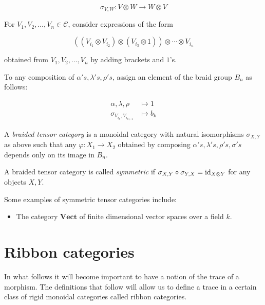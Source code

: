 \begin{equation}
    \sigma_{V,W} : V \otimes W \to W \otimes V
\end{equation}

For $V_1, V_2, \dots, V_n \in \mathcal{C}$, consider expressions of the form 

\begin{equation}
    ((V_{i_1}\otimes V_{i_2}) \otimes (V_{i_3} \otimes 1)) \otimes \cdots \otimes V_{i_n}
\end{equation}

obtained from $V_1,V_2,\ldots,V_n$ by adding brackets and $1$'s.

To any composition of $\alpha's, \lambda's, \rho's$, assign an element of the
braid group $B_n$ as follows:

\begin{align}
    \alpha, \lambda, \rho &\mapsto 1 \\
    \sigma_{V_{i_k}, V_{i_{k+1}}} &\mapsto b_k
\end{align}

\begin{defn}
    A \emph{braided tensor category} is a monoidal category with natural
    isomorphisms $\sigma_{X,Y}$ as above such that any $\varphi: X_1 \to X_2$
    obtained by composing $\alpha's, \lambda's, \rho's, \sigma's$ depends only
    on its image in $B_n$.
\end{defn}

\begin{defn}
    A braided tensor category is called \emph{symmetric} if $\sigma_{X,Y} \circ
    \sigma_{Y,X} = \operatorname{id}_{X \otimes Y}$ for any objects $X,Y$.
\end{defn}

Some examples of symmetric tensor categories include:

\begin{itemize}
    \item The category $\mathbf{Vect}$ of finite dimensional vector spaces over a field $k$.
\end{itemize}

\section{Ribbon categories}
\label{section:RibbonCategories}

In what follows it will become important to have a notion of the trace of a
morphism. The definitions that follow will allow us to define a trace in a
certain class of rigid monoidal categories called ribbon categories.

